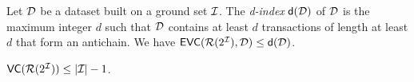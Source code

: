 \begin{theorem}\label{thm:empvcdimubfirst}
  Let ${\cal D}$ be a dataset built on a
  ground set ${\cal I}$. The
  \emph{d-index} $\mathsf{d}({\cal D})$ of ${\cal D}$ is the maximum integer $d$ such that
  ${\cal D}$ contains at least $d$ transactions of length at least $d$ %
  that form an antichain. %
  We have $\mathsf{EVC}(\mathcal{R}(2^{\cal I}),{\cal D})\le \mathsf{d}({\cal D})$.
\end{theorem}



\begin{corollary}\label{thm:vcdimubfirst}
  $\mathsf{VC}(\mathcal{R}(2^{\cal I}))\le |{\cal I}|-1$.
\end{corollary}

